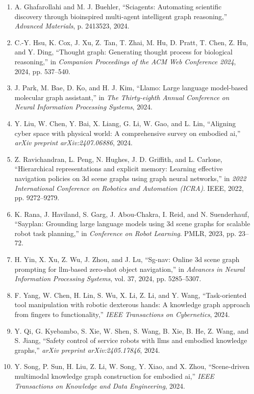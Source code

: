 \documentclass[10pt,UTF8,fontset=fandol]{ctexart}
\begin{document}
\begin{enumerate}[leftmargin=2.4em,labelsep=0.4em,itemsep=0.15em]
\item A. Ghafarollahi and M. J. Buehler, ``Sciagents: Automating scientific discovery through bioinspired multi-agent intelligent graph reasoning,'' \textit{Advanced Materials}, p. 2413523, 2024.
\item C.-Y. Hsu, K. Cox, J. Xu, Z. Tan, T. Zhai, M. Hu, D. Pratt, T. Chen, Z. Hu, and Y. Ding, ``Thought graph: Generating thought process for biological reasoning,'' in \textit{Companion Proceedings of the ACM Web Conference 2024}, 2024, pp. 537--540.
\item J. Park, M. Bae, D. Ko, and H. J. Kim, ``Llamo: Large language model-based molecular graph assistant,'' in \textit{The Thirty-eighth Annual Conference on Neural Information Processing Systems}, 2024.
\item Y. Liu, W. Chen, Y. Bai, X. Liang, G. Li, W. Gao, and L. Lin, ``Aligning cyber space with physical world: A comprehensive survey on embodied ai,'' \textit{arXiv preprint arXiv:2407.06886}, 2024.
\item Z. Ravichandran, L. Peng, N. Hughes, J. D. Griffith, and L. Carlone, ``Hierarchical representations and explicit memory: Learning effective navigation policies on 3d scene graphs using graph neural networks,'' in \textit{2022 International Conference on Robotics and Automation (ICRA)}. IEEE, 2022, pp. 9272--9279.
\item K. Rana, J. Haviland, S. Garg, J. Abou-Chakra, I. Reid, and N. Suenderhauf, ``Sayplan: Grounding large language models using 3d scene graphs for scalable robot task planning,'' in \textit{Conference on Robot Learning}. PMLR, 2023, pp. 23--72.
\item H. Yin, X. Xu, Z. Wu, J. Zhou, and J. Lu, ``Sg-nav: Online 3d scene graph prompting for llm-based zero-shot object navigation,'' in \textit{Advances in Neural Information Processing Systems}, vol. 37, 2024, pp. 5285--5307.
\item F. Yang, W. Chen, H. Lin, S. Wu, X. Li, Z. Li, and Y. Wang, ``Task-oriented tool manipulation with robotic dexterous hands: A knowledge graph approach from fingers to functionality,'' \textit{IEEE Transactions on Cybernetics}, 2024.
\item Y. Qi, G. Kyebambo, S. Xie, W. Shen, S. Wang, B. Xie, B. He, Z. Wang, and S. Jiang, ``Safety control of service robots with llms and embodied knowledge graphs,'' \textit{arXiv preprint arXiv:2405.17846}, 2024.
\item Y. Song, P. Sun, H. Liu, Z. Li, W. Song, Y. Xiao, and X. Zhou, ``Scene-driven multimodal knowledge graph construction for embodied ai,'' \textit{IEEE Transactions on Knowledge and Data Engineering}, 2024.

\end{enumerate}
\end{document}
